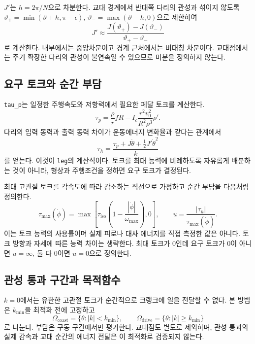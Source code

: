 \(J'\)는 \(h=2\pi/N\)으로 차분한다. 교대 경계에서 반대쪽 다리의 관성과 섞이지 않도록 \(\vartheta_+=\min(\vartheta+h,\pi-\epsilon)\), \(\vartheta_-=\max(\vartheta-h,0)\)으로 제한하여
\[
J'\approx\frac{J(\vartheta_+)-J(\vartheta_-)}{\vartheta_+-\vartheta_-}
\]
로 계산한다. 내부에서는 중앙차분이고 경계 근처에서는 비대칭 차분이다. 교대점에서는 주기 확장한 다리의 관성이 불연속일 수 있으므로 미분을 정의하지 않는다.

\subsection{요구 토크와 순간 부담}
\texttt{tau\_p}는 일정한 주행속도와 저항력에서 필요한 페달 토크를 계산한다.
\begin{equation}
\tau_p=\frac{\rho}{r}fR-I_c\frac{r^2v_0^2}{R^2\rho^3}\rho'.
\label{eq:me-taup}
\end{equation}
다리의 입력 동력과 출력 동력 차이가 운동에너지 변화율과 같다는 관계에서
\begin{equation}
\tau_h=\frac{\tau_p+J\ddot\theta+\tfrac12J'\dot\theta^2}{k}
\label{eq:me-tauh}
\end{equation}
를 얻는다. 이것이 \texttt{leg}의 계산식이다. 토크를 최대 능력에 비례하도록 자유롭게 배분하는 것이 아니라, 형상과 주행조건을 정하면 요구 토크가 결정된다.

최대 고관절 토크를 각속도에 따라 감소하는 직선으로 가정하고 순간 부담을 다음처럼 정의한다.
\begin{equation}
\tau_{\max}(\dot\phi)=\max\left[\tau_{\mathrm{iso}}\left(1-\frac{|\dot\phi|}{\omega_{\max}}\right),0\right],\qquad
u=\frac{|\tau_h|}{\tau_{\max}(\dot\phi)}.
\label{eq:8}
\end{equation}
이는 토크 능력의 사용률이며 실제 피로나 대사 에너지를 직접 측정한 값은 아니다. 토크 방향과 자세에 따른 능력 차이는 생략한다. 최대 토크가 0인데 요구 토크가 0이 아니면 \(u=\infty\), 둘 다 0이면 \(u=0\)으로 정의한다.

\subsection{관성 통과 구간과 목적함수}
\(k=0\)에서는 유한한 고관절 토크가 순간적으로 크랭크에 일을 전달할 수 없다. 본 방법은 \(k_{\min}\)을 최적화 전에 고정하고
\[
\Omega_{\mathrm{coast}}=\{\theta:|k|<k_{\min}\},\qquad
\Omega_{\mathrm{drive}}=\{\theta:|k|\geq k_{\min}\}
\]
로 나눈다. 부담은 구동 구간에서만 평가한다. 교대점도 별도로 제외하며, 관성 통과의 실제 감속과 교대 순간의 에너지 전달은 이 최적화로 검증되지 않는다.

